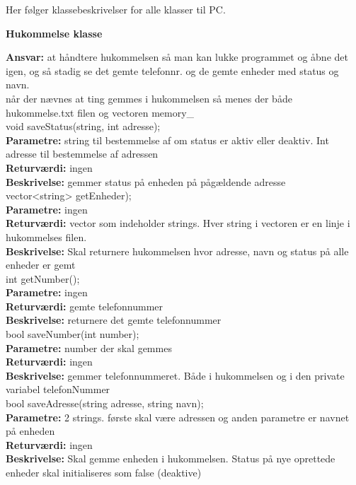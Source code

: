 Her følger klassebeskrivelser for alle klasser til PC. \\

{\centering
\textbf{Hukommelse klasse}\par
}
\textbf{Ansvar:} at håndtere hukommelsen så man kan lukke programmet og åbne det igen, og så stadig se det gemte telefonnr. og de gemte enheder med status og navn. \\
når der nævnes at ting gemmes i hukommelsen så menes der både hukommelse.txt filen og vectoren memory\_ \\

void saveStatus(string, int adresse); \\
\textbf{Parametre:} string til bestemmelse af om status er aktiv eller deaktiv. Int adresse til bestemmelse af adressen \\
\textbf{Returværdi:} ingen \\
\textbf{Beskrivelse:} gemmer status på enheden på pågældende adresse \\

vector<string> getEnheder); \\
\textbf{Parametre:} ingen \\
\textbf{Returværdi:} vector som indeholder strings. Hver string i vectoren er en linje i hukommelses filen. \\
\textbf{Beskrivelse:}  Skal returnere hukommelsen hvor adresse, navn og status på alle enheder er gemt \\

int getNumber(); \\
\textbf{Parametre:} ingen \\
\textbf{Returværdi:} gemte telefonnummer \\
\textbf{Beskrivelse:} returnere det gemte telefonnummer \\

bool saveNumber(int number); \\
\textbf{Parametre:} number der skal gemmes \\
\textbf{Returværdi:} ingen \\
\textbf{Beskrivelse:} gemmer telefonnummeret. Både i hukommelsen og i den private variabel telefonNummer \\

bool saveAdresse(string adresse, string navn); \\
\textbf{Parametre:} 2 strings. første skal være adressen og anden parametre er navnet på enheden \\
\textbf{Returværdi:} ingen \\
\textbf{Beskrivelse:} Skal gemme enheden i hukommelsen. Status på nye oprettede enheder skal initialiseres som false (deaktive) \\

